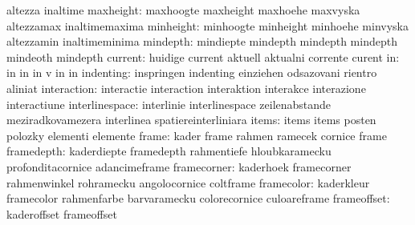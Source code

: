                            altezza                   inaltime
                maxheight: maxhoogte                 maxheight
                           maxhoehe                  maxvyska
                           altezzamax                inaltimemaxima
                minheight: minhoogte                 minheight
                           minhoehe                  minvyska
                           altezzamin                inaltimeminima
                 mindepth: mindiepte                 mindepth
                           mindepth                  mindepth
                           mindeoth                  mindepth %
                  current: huidige                   current
                           aktuell                   aktualni
                           corrente                  curent
                       in: in                        in
                           in                        v
                           in                        in
                indenting: inspringen                indenting
                           einziehen                 odsazovani
                           rientro                   aliniat
              interaction: interactie                interaction
                           interaktion               interakce
                           interazione               interactiune
           interlinespace: interlinie                interlinespace
                           zeilenabstande            meziradkovamezera
                           interlinea                spatiereinterliniara
                    items: items                     items
                           posten                    polozky
                           elementi                  elemente
                    frame: kader                     frame
                           rahmen                    ramecek
                           cornice                   frame
               framedepth: kaderdiepte               framedepth
                           rahmentiefe               hloubkaramecku
                           profonditacornice         adancimeframe
              framecorner: kaderhoek                 framecorner
                           rahmenwinkel              rohramecku
                           angolocornice             coltframe
               framecolor: kaderkleur                framecolor
                           rahmenfarbe               barvaramecku
                           colorecornice             culoareframe
              frameoffset: kaderoffset               frameoffset
